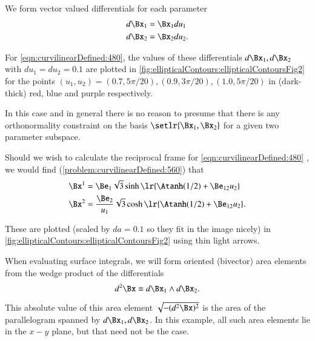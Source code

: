 We form vector valued differentials for each parameter
\begin{dmath}\label{eqn:curvilinearDefined:500}
\begin{aligned}
d\Bx_{1} &= \Bx_1 du_1 \\
d\Bx_{2} &= \Bx_2 du_2.
\end{aligned}
\end{dmath}

For \cref{eqn:curvilinearDefined:480},
the values of these differentials \( d\Bx_1, d\Bx_2 \) with \( du_1 = du_2 = 0.1 \) are plotted
in
\cref{fig:ellipticalContours:ellipticalContoursFig2}
for the points
\( (u_1, u_2) = (0.7, 5 \pi/20), (0.9, 3 \pi/20), (1.0, 5 \pi/20) \)
in
(dark-thick) red, blue and purple respectively.


In this case and in general there is no reason to presume that there is any orthonormality constraint on the basis \( \setlr{ \Bx_{1}, \Bx_{2} } \) for a given two parameter subspace.

Should we wish to calculate the reciprocal frame
for \cref{eqn:curvilinearDefined:480}
, we would find
(\cref{problem:curvilinearDefined:560}) that
\begin{dmath}\label{eqn:curvilinearDefined:540}
\begin{aligned}
\Bx^{1} &= \Be_1 \sqrt{3} \sinh\lr{ \Atanh(1/2) + \Be_{12} u_2 } \\
\Bx^{2} &= \frac{\Be_2}{u_1} \sqrt{3} \cosh\lr{ \Atanh(1/2) + \Be_{12} u_2 }.
\end{aligned}
\end{dmath}

These are plotted (scaled by \( da = 0.1 \) so they fit in the image nicely) in \cref{fig:ellipticalContours:ellipticalContoursFig2} using thin light arrows.

When evaluating surface integrals, we will form
oriented (bivector) area elements from the wedge product of the differentials
\begin{dmath}\label{eqn:curvilinearDefined:60}
d^2 \Bx \equiv d\Bx_{1} \wedge d\Bx_{2}.
\end{dmath}

This absolute value of this area element \( \sqrt{-(d^2 \Bx)^2} \) is the area of the parallelogram spanned by \( d\Bx_1, d\Bx_2 \).
In this example, all such area elements lie in the \( x-y \) plane, but that need not be the case.

